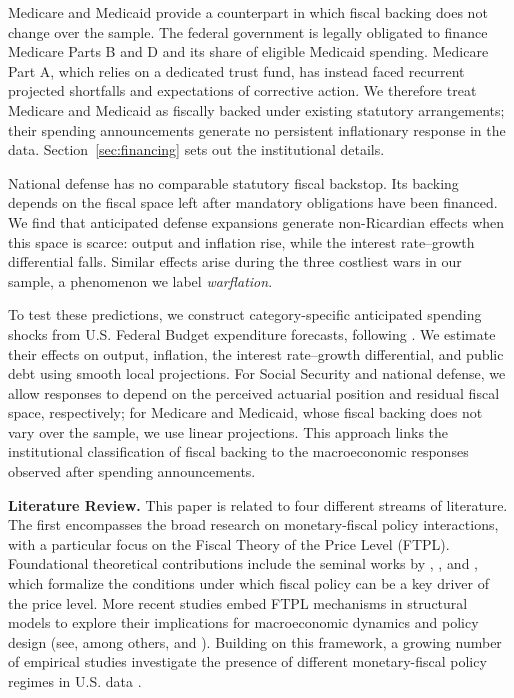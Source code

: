 \documentclass[12pt]{article}%
\theoremstyle{remark}
\begin{document}
Medicare and Medicaid provide a counterpart in which fiscal backing does not change over the sample. The federal government is legally obligated to finance Medicare Parts B and D and its share of eligible Medicaid spending. Medicare Part A, which relies on a dedicated trust fund, has instead faced recurrent projected shortfalls and expectations of corrective action. We therefore treat Medicare and Medicaid as fiscally backed under existing statutory arrangements; their spending announcements generate no persistent inflationary response in the data. Section~\ref{sec:financing} sets out the institutional details.

National defense has no comparable statutory fiscal backstop. Its backing depends on the fiscal space left after mandatory obligations have been financed. We find that anticipated defense expansions generate non-Ricardian effects when this space is scarce: output and inflation rise, while the interest rate--growth differential falls. Similar effects arise during the three costliest wars in our sample, a phenomenon we label \textit{warflation}.

To test these predictions, we construct category-specific anticipated spending shocks from U.S. Federal Budget expenditure forecasts, following \cite{ForniGambetti2016}. We estimate their effects on output, inflation, the interest rate--growth differential, and public debt using smooth local projections. For Social Security and national defense, we allow responses to depend on the perceived actuarial position and residual fiscal space, respectively; for Medicare and Medicaid, whose fiscal backing does not vary over the sample, we use linear projections. This approach links the institutional classification of fiscal backing to the macroeconomic responses observed after spending announcements.

\textbf{Literature Review.} This paper is related to four different streams of literature. 
The first encompasses the broad research on monetary-fiscal policy interactions, with a particular focus on the Fiscal Theory of the Price Level (FTPL). Foundational theoretical contributions include the seminal works by \cite{sargentWallace1981}, \cite{Leeper1991}, \cite{Sims1994} and \cite{Woodford2001}, which formalize the conditions under which fiscal policy can be a key driver of the price level. More recent studies embed FTPL mechanisms in structural models to explore their implications for macroeconomic dynamics and policy design (see, among others, \cite{Cochranebook} and \cite{leeperleithcampbell2016understanding}).
Building on this framework, a growing number of empirical studies investigate the presence of different monetary-fiscal policy regimes in U.S. data \citep[see, among the others,][]{Bianchi2012,Bianchiillut,AscariFlorioGobbi2020, BM2014, JacobsonLeeperPreston2024}.  
\end{document}
